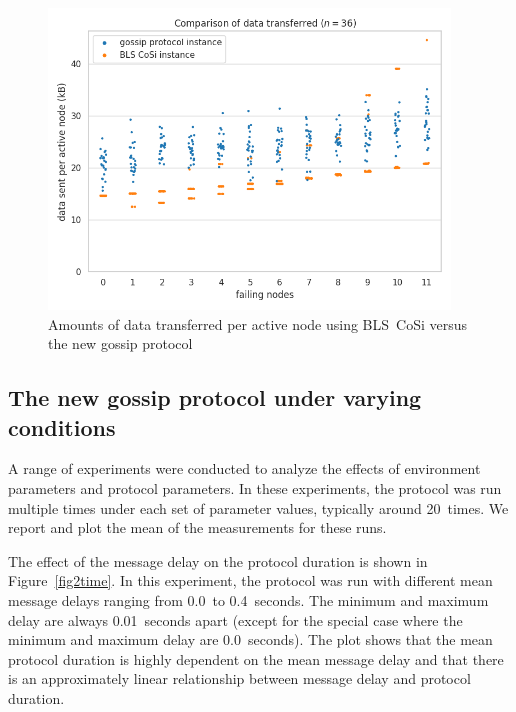 \begin{figure}[!htbp]
    \centering
    \includegraphics[width=0.95\textwidth]{figures/1/bandwidth_tx_sum_36_big.png}
    \caption{Amounts of data transferred per active node using BLS~CoSi versus the new gossip protocol}
    \label{fig1data}
\end{figure}


\subsection{The new gossip protocol under varying conditions}

A range of experiments were conducted to analyze the effects of environment parameters and protocol parameters.
In these experiments, the protocol was run multiple times under each set of parameter values, typically around 20~times.
We report and plot the mean of the measurements for these runs.

The effect of the message delay on the protocol duration is shown in Figure~\ref{fig2time}.
In this experiment, the protocol was run with different mean message delays ranging from 0.0~to 0.4~seconds.
The minimum and maximum delay are always 0.01~seconds apart (except for the special case where the minimum and maximum delay are 0.0~seconds).
The plot shows that the mean protocol duration is highly dependent on the mean message delay and that there is an approximately linear relationship between message delay and protocol duration.

